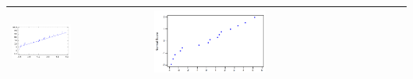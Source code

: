 \documentclass[
  10pt,
  ignorenonframetext,
]{beamer}
\begin{document}
\begin{frame}{}
\protect\hypertarget{section-43}{}
\begin{longtable}[]{@{}
  >{\raggedright\arraybackslash}p{}
  >{\raggedleft\arraybackslash}p{}@{}}
\toprule()
\endhead
\includegraphics[width=0.45\textwidth,height=\textheight]{figuras/Papel1.png}
&
\includegraphics[width=0.45\textwidth,height=\textheight]{figuras/Papel2.png} \\
\bottomrule()
\end{longtable}
\end{frame}
\end{document}

